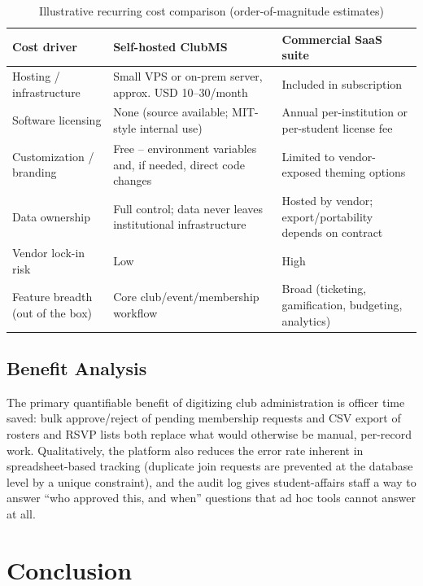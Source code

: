 \documentclass[12pt,oneside]{book}
\begin{document}
\begin{table}[H]
\caption{Illustrative recurring cost comparison (order-of-magnitude estimates)}
\label{tab:6.2}
\centering
\small
\begin{tabularx}{\textwidth}{@{}p{3.6cm}XX@{}}
\toprule
Cost driver & Self-hosted ClubMS & Commercial SaaS suite \\
\midrule
Hosting / infrastructure & Small VPS or on-prem server, approx. USD 10--30/month & Included in subscription \\
Software licensing & None (source available; MIT-style internal use) & Annual per-institution or per-student license fee \\
Customization / branding & Free -- environment variables and, if needed, direct code changes & Limited to vendor-exposed theming options \\
Data ownership & Full control; data never leaves institutional infrastructure & Hosted by vendor; export/portability depends on contract \\
Vendor lock-in risk & Low & High \\
Feature breadth (out of the box) & Core club/event/membership workflow & Broad (ticketing, gamification, budgeting, analytics) \\
\bottomrule
\end{tabularx}
\end{table}

\section{Benefit Analysis}

The primary quantifiable benefit of digitizing club administration is officer time saved: bulk approve/reject of pending membership requests and CSV export of rosters and RSVP lists both replace what would otherwise be manual, per-record work. Qualitatively, the platform also reduces the error rate inherent in spreadsheet-based tracking (duplicate join requests are prevented at the database level by a unique constraint), and the audit log gives student-affairs staff a way to answer ``who approved this, and when'' questions that ad hoc tools cannot answer at all.


\chapter{Conclusion}
\end{document}
